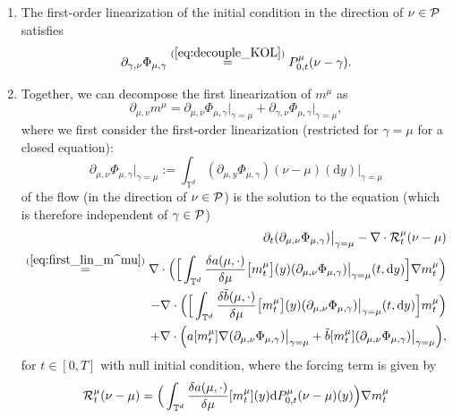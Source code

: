 \begin{enumerate}
\item The first-order linearization of the initial condition in the direction of $\nu \in \mathcal{P}$ satisfies 
\begin{equation}\label{eq:first_lin_Phi_initial}
\partial_{\gamma,\nu} \Phi_{\mu,\gamma}\overset{(\ref{eq:decouple_KOL})}{=} P_{0,t}^{\mu}(\nu - \gamma).
\end{equation}
\item Together, we can decompose the first linearization of $m^{\mu}$ as 
\begin{equation}\label{eq:first_lin_m^mu}
 \partial_{\mu,\nu} m^{\mu} = \partial_{\mu,\nu} \Phi_{\mu,\gamma}\Big|_{\gamma = \mu} +\partial_{\gamma,\nu} \Phi_{\mu,\gamma}\Big|_{\gamma = \mu},
\end{equation}
where we first consider the first-order linearization (restricted for $\gamma = \mu$ for a closed equation):
\[
\partial_{\mu,\nu} \Phi_{\mu,\gamma}\Big|_{\gamma = \mu} := \int_{\mathbb{T}^{d}}(\partial_{\mu,y} \Phi_{\mu,\gamma}) (\nu - \mu)(\mathrm{d}y)\Big|_{\gamma = \mu}
\]
of the flow (in the direction of $\nu \in \mathcal{P}$) is the solution to the equation (which is therefore independent of $\gamma \in \mathcal{P}$)
\begin{equation}\label{eq:first-order-deriv-KOL_re}
\begin{split}
\partial_t (\partial_{\mu,\nu} \Phi_{\mu,\gamma})\big|_{\gamma = \mu} - \nabla \cdot \mathcal{R}^{\mu}_t(\nu - \mu)\\
 \overset{(\ref{eq:first_lin_m^mu})}{=} \nabla \cdot \Big( \Big[ \int_{\mathbb{T}^d} \frac{\delta a(\mu, \cdot)}{\delta\mu}\big[m_t^{\mu}\big](y)(\partial_{\mu,\nu} \Phi_{\mu,\gamma})\big|_{\gamma = \mu}(t,\mathrm{d}y)\Big]  \nabla m^{\mu}_t\Big) \\
  -  \nabla \cdot \Big(\Big[ \int_{\mathbb{T}^d} \frac{\delta \tilde{b}(\mu, \cdot)}{\delta\mu}\big[m_t^{\mu}\big](y)(\partial_{\mu,\nu} \Phi_{\mu,\gamma})\big|_{\gamma = \mu}(t,\mathrm{d}y)\Big]  m^{\mu}_t\Big) \\
  +  \nabla \cdot \Big( a[m_t^{\mu}] \nabla (\partial_{\mu,\nu} \Phi_{\mu,\gamma})\big|_{\gamma = \mu} + \tilde{b}[m_t^{\mu}] (\partial_{\mu,\nu} \Phi_{\mu,\gamma})\big|_{\gamma = \mu}\Big),
\end{split}
\end{equation}
for $t \in [0,T]$ with null initial condition, where the forcing term is given by 
\begin{align*}
\mcl{R}^{\mu}_t(\nu - \mu) =  \Big(\int_{\mathbb{T}^d}\frac{\delta a(\mu, \cdot)}{\delta\mu}[m_t^{\mu}](y)\mathrm{d}P^{\mu}_{0,t} (\nu - \mu)(y) \Big)\nabla m^{\mu}_t \\

\end{align*}
\end{enumerate}
